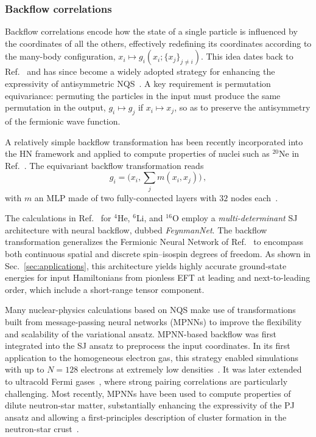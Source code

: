 \subsubsection{Backflow correlations}
\label{subsub:backflow_correlations}

Backflow correlations encode how the state of a single particle is influenced by the coordinates of all the others, effectively redefining its coordinates according to the many-body configuration,
$x_i \mapsto g_i(x_i; \{ x_j\}_{j \neq i})$.
This idea dates back to Ref.~\cite{feynman_energy_1956} and has since become a widely adopted strategy for enhancing the expressivity of antisymmetric NQS~\cite{luo_backflow_2019,hermann_deep-neural-network_2020,pfau_ab_2020}.
A key requirement is permutation equivariance: permuting the particles in the input must produce the same permutation in the output, $g_i \mapsto g_j$ if $x_i \mapsto x_j$, so as to preserve the antisymmetry of the fermionic wave function.

A relatively simple backflow transformation has been recently incorporated into the HN framework and applied to compute properties of nuclei such as $^{20}$Ne in Ref.~\cite{gnech_distilling_2024}.
The equivariant backflow transformation reads
\begin{equation}\label{eq:mpnn}
g_i = \Big(x_i, \sum_j m(x_i, x_j) \Big)\, ,
\end{equation}
with $m$ an MLP made of two fully-connected layers with $32$ nodes each~\cite{gnech_distilling_2024}.

The calculations in Ref.~\cite{Yang:2023rlw} for $^4$He, $^6$Li, and $^{16}$O employ a \emph{multi-determinant} SJ architecture with neural backflow, dubbed \emph{FeynmanNet}.
The backflow transformation generalizes the Fermionic Neural Network of Ref.~\cite{pfau_ab_2020} to encompass both continuous spatial and discrete spin--isospin degrees of freedom.
As shown in Sec.~\ref{sec:applications}, this architecture yields highly accurate ground-state energies for input Hamiltonians from pionless EFT at leading and next-to-leading order, which include a short-range tensor component.

Many nuclear-physics calculations based on NQS make use of transformations built from message-passing neural networks (MPNNs) to improve the flexibility and scalability of the variational ansatz.
MPNN-based backflow was first integrated into the SJ ansatz to preprocess the input coordinates.
In its first application to the homogeneous electron gas, this strategy enabled simulations with up to $N=128$ electrons at extremely low densities~\cite{pescia_message-passing_2024}.
It was later extended to ultracold Fermi gases~\cite{kim_neural-network_2024}, where strong pairing correlations are particularly challenging.
Most recently, MPNNs have been used to compute properties of dilute neutron-star matter, substantially enhancing the expressivity of the PJ ansatz and allowing a first-principles description of cluster formation in the neutron-star crust~\cite{fore_investigating_2024}.

